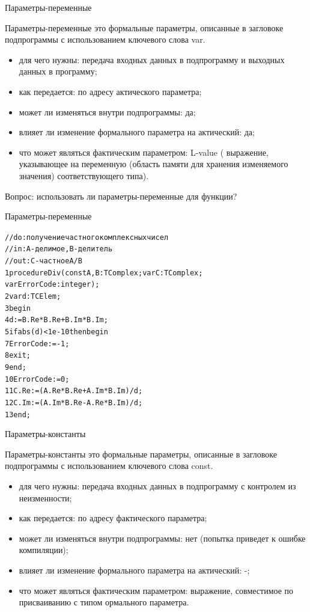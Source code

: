 \documentclass{beamer}
\begin{document}
\begin{frame}[fragile]{Параметры-переменные}
\begin{block}{Параметры-переменные}
это формальные параметры, описанные в загловоке подпрограммы с использованием ключевого слова var.
\end{block}
\begin{itemize}
\item для чего нужны: передача входных данных в подпрограмму и выходных данных в программу;
\item как передается: по адресу актического параметра;
\item может ли изменяться внутри подпрограммы: да;
\item влияет ли изменение формального параметра на актический: да;
\item что может являться фактическим параметром: L-value ( выражение, указывающее на переменную (область памяти для хранения изменяемого значения) соответствующего типа).
\end{itemize}
Вопрос: использовать ли параметры-переменные для функции?
\end{frame}

\begin{frame}[fragile]{Параметры-переменные}
\begin{alltt}
//do: получение частного комплексных чисел
//in: A - делимое, B - делитель
//out: С - частное A / B
1 procedure Div(const A, B: TComplex; var C: TComplex; 
    var ErrorCode: integer);
2  var d: TCElem;
3  begin
4    d := B.Re * B.Re + B.Im * B.Im;
5    if abs(d) < 1e-10 then begin
7      ErrorCode := -1;
8      exit;
9    end;
10   ErrorCode := 0;
11   C.Re := (A.Re * B.Re + A.Im * B.Im) / d;
12   C.Im := (A.Im * B.Re - A.Re * B.Im) / d;
13 end;	
\end{alltt}
\end{frame}

\begin{frame}[fragile]{Параметры-константы}
\begin{block}{Параметры-константы}
это формальные параметры, описанные в загловоке подпрограммы с использованием ключевого слова const.
\end{block}
\begin{itemize}
\item для чего нужны: передача входных данных в подпрограмму с контролем из неизменности;
\item как передается: по адресу фактического параметра;
\item может ли изменяться внутри подпрограммы: нет (попытка приведет к ошибке компиляции);
\item влияет ли изменение формального параметра на актический: -;
\item что может являться фактическим параметром: выражение, совместимое по присваиванию с типом ормального параметра.
\end{itemize}
\end{frame}
\end{document}
